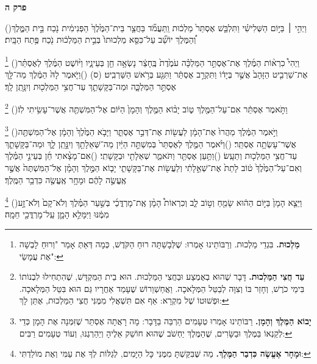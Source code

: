 \documentclass[12pt, openany]{book}
\newcommand{\chapname}{}
\newcommand{\newchap}[1]{
	\addcontentsline{toc}{chapter}{#1}
	\renewcommand{\chapname}{#1}
		\begin{center}
			\textbf{%
\fontsize{16pt}{16pt}\selectfont
				#1}
		\end{center}
}
\newcommand{\footnotecomment}[1]{
	\renewcommand\thefootnote{}
	\footnote{\textsf{#1}}}
\newcommand{\commenta}[1]{\footnotecomment{#1}\hspace{0em}}
\newcommand{\vsnum}[1]{(\hebrewnumeral{#1})\space}
\begin{document}
\newchap{פרק ה}
\begin{multicols}{2}
\vsnum{1}וַיְהִ֣י ׀ בַּיּ֣וֹם הַשְּׁלִישִׁ֗י וַתִּלְבַּ֤שׁ אֶסְתֵּר֙ מַלְכ֔וּת וַֽתַּעֲמֹ֞ד בַּחֲצַ֤ר בֵּית־הַמֶּ֙לֶךְ֙ הַפְּנִימִ֔ית נֹ֖כַח בֵּ֣ית הַמֶּ֑לֶךְ וְ֠הַמֶּלֶךְ יוֹשֵׁ֞ב עַל־כִּסֵּ֤א מַלְכוּתוֹ֙ בְּבֵ֣ית הַמַּלְכ֔וּת נֹ֖כַח פֶּ֥תַח הַבָּֽיִת׃%
\commenta{\textrm{\textbf{מַלְכוּת.}} בִּגְדֵי מַלְכוּת. וְרַבּוֹתֵינוּ אָמְרוּ: שֶׁלְּבָשַׁתָּה רוּחַ הַקֹּדֶשׁ, כְּמָה דְּאַתְּ אָמַר "וְרוּחַ לָבְשָׁה אֶת עֲמָשַׂי": }%
\vsnum{2}וַיְהִי֩ כִרְא֨וֹת הַמֶּ֜לֶךְ אֶת־אֶסְתֵּ֣ר הַמַּלְכָּ֗ה עֹמֶ֙דֶת֙ בֶּֽחָצֵ֔ר נָשְׂאָ֥ה חֵ֖ן בְּעֵינָ֑יו וַיּ֨וֹשֶׁט הַמֶּ֜לֶךְ לְאֶסְתֵּ֗ר אֶת־שַׁרְבִ֤יט הַזָּהָב֙ אֲשֶׁ֣ר בְּיָד֔וֹ וַתִּקְרַ֣ב אֶסְתֵּ֔ר וַתִּגַּ֖ע בְּרֹ֥אשׁ הַשַּׁרְבִֽיט׃ (ס)
\vsnum{3}וַיֹּ֤אמֶר לָהּ֙ הַמֶּ֔לֶךְ מַה־לָּ֖ךְ אֶסְתֵּ֣ר הַמַּלְכָּ֑ה וּמַה־בַּקָּשָׁתֵ֛ךְ עַד־חֲצִ֥י הַמַּלְכ֖וּת וְיִנָּ֥תֵֽן לָֽךְ׃%
\commenta{\textrm{\textbf{עַד חֲצִי הַמַּלְכוּת.}} דָּבָר שֶׁהוּא בְאֶמְצַע וּבַחֲצִי הַמַּלְכוּת. הוּא בֵית הַמִּקְדָּשׁ, שֶׁהִתְחִילוּ לִבְנוֹתוֹ בִּימֵי כֹרֶשׁ, וְחָזַר בּוֹ וְצִוָּה לְבַטֵּל הַמְּלָאכָה. וַאֲחַשְׁוֵרוֹשׁ שֶׁעָמַד אַחֲרָיו גַּם הוּא בִּטֵּל הַמְּלָאכָה. וּפְשׁוּטוֹ שֶׁל מִקְרָא: אַף אִם תִּשְׁאֲלִי מִמֶּנִּי חֲצִי הַמַּלְכוּת, אֶתֵּן לָךְ: }%
\vsnum{4}וַתֹּ֣אמֶר אֶסְתֵּ֔ר אִם־עַל־הַמֶּ֖לֶךְ ט֑וֹב יָב֨וֹא הַמֶּ֤לֶךְ וְהָמָן֙ הַיּ֔וֹם אֶל־הַמִּשְׁתֶּ֖ה אֲשֶׁר־עָשִׂ֥יתִי לֽוֹ׃%
\commenta{\textrm{\textbf{יָבוֹא הַמֶּלֶךְ וְהָמָן.}} רַבּוֹתֵינוּ אָמְרוּ טְעָמִים הַרְבֵּה בַדָּבָר: מָה רָאֲתָה אֶסְתֵּר שֶׁזִּמְּנָה אֶת הָמָן כְּדֵי לְקַנְאוֹ בַּמֶּלֶךְ וּבַשָּׂרִים, שֶׁהַמֶּלֶךְ יַחְשֹׁב שֶׁהוּא חוֹשֵׁק אֵלֶיהָ וְיַהַרְגֶנּוּ, וְעוֹד טְעָמִים רַבִּים: }%
\vsnum{5}וַיֹּ֣אמֶר הַמֶּ֔לֶךְ מַהֲרוּ֙ אֶת־הָמָ֔ן לַעֲשׂ֖וֹת אֶת־דְּבַ֣ר אֶסְתֵּ֑ר וַיָּבֹ֤א הַמֶּ֙לֶךְ֙ וְהָמָ֔ן אֶל־הַמִּשְׁתֶּ֖ה אֲשֶׁר־עָשְׂתָ֥ה אֶסְתֵּֽר׃
\vsnum{6}וַיֹּ֨אמֶר הַמֶּ֤לֶךְ לְאֶסְתֵּר֙ בְּמִשְׁתֵּ֣ה הַיַּ֔יִן מַה־שְּׁאֵלָתֵ֖ךְ וְיִנָּ֣תֵֽן לָ֑ךְ וּמַה־בַּקָּשָׁתֵ֛ךְ עַד־חֲצִ֥י הַמַּלְכ֖וּת וְתֵעָֽשׂ׃
\vsnum{7}וַתַּ֥עַן אֶסְתֵּ֖ר וַתֹּאמַ֑ר שְׁאֵלָתִ֖י וּבַקָּשָׁתִֽי׃
\vsnum{8}אִם־מָצָ֨אתִי חֵ֜ן בְּעֵינֵ֣י הַמֶּ֗לֶךְ וְאִם־עַל־הַמֶּ֙לֶךְ֙ ט֔וֹב לָתֵת֙ אֶת־שְׁאֵ֣לָתִ֔י וְלַעֲשׂ֖וֹת אֶת־בַּקָּשָׁתִ֑י יָב֧וֹא הַמֶּ֣לֶךְ וְהָמָ֗ן אֶל־הַמִּשְׁתֶּה֙ אֲשֶׁ֣ר אֶֽעֱשֶׂ֣ה לָהֶ֔ם וּמָחָ֥ר אֶֽעֱשֶׂ֖ה כִּדְבַ֥ר הַמֶּֽלֶךְ׃%
\commenta{\textrm{\textbf{וּמָחָר אֶעֱשֶׂה כִּדְבַר הַמֶּלֶךְ.}} מַה שֶּׁבִּקַּשְׁתָּ מִמֶּנִּי כָּל הַיָּמִים, לְגַלּוֹת לְךָ אֶת עַמִּי וְאֶת מוֹלַדְתִּי: }%
\vsnum{9}וַיֵּצֵ֤א הָמָן֙ בַּיּ֣וֹם הַה֔וּא שָׂמֵ֖חַ וְט֣וֹב לֵ֑ב וְכִרְאוֹת֩ הָמָ֨ן אֶֽת־מָרְדֳּכַ֜י בְּשַׁ֣עַר הַמֶּ֗לֶךְ וְלֹא־קָם֙ וְלֹא־זָ֣ע מִמֶּ֔נּוּ וַיִּמָּלֵ֥א הָמָ֛ן עַֽל־מָרְדֳּכַ֖י חֵמָֽה׃

\end{multicols}
\end{document}
